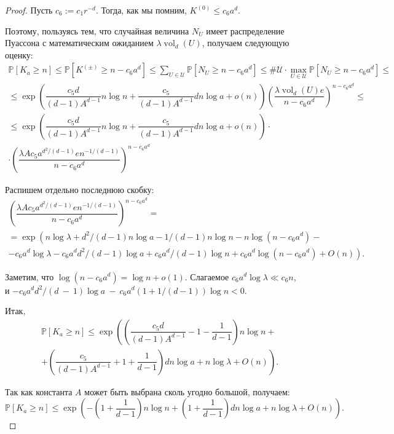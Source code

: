 \documentclass[12pt]{article}
\theoremstyle{plain}
\theoremstyle{definition}
\theoremstyle{remark}
\def\geq{\geqslant}
\def\leq{\leqslant}
\DeclareMathOperator{\vol}{vol}
\newcommand{\PP}{\mathbb{P}}
\begin{document}
\begin{proof}
Пусть $c_6 := c_1r^{-d}$. Тогда, как мы помним, $K^{(0)}\leq c_6a^d.$

Поэтому, пользуясь тем, что случайная величина $N_U$  имеет распределение Пуассона с математическим ожиданием $\lambda\vol_d(U)$, получаем следующую оценку: 
\begin{multline*}
    \PP[K_a\geq n] \leq \PP[K^{(\pm)} \geq n-c_6a^d] \leq \sum_{U\in\mathcal{U}}\PP[N_U \geq n-c_6a^d] \leq
    \#\mathcal{U}\cdot\max_{U\in\mathcal{U}}\PP[N_U\geq n- c_6a^d] \leq \\
    \leq  \exp \left(\dfrac{c_5d}{(d-1)A^{d-1}}n\log n + \dfrac{c_5}{(d-1)A^{d-1}}dn\log a + o(n)\right) \left(\dfrac{\lambda\vol_d(U)e}{n-c_6a^d}\right)^{n-c_6a^d} \leq \\
    \leq 
    \exp \left(\dfrac{c_5d}{(d-1)A^{d-1}}n\log n + \dfrac{c_5}{(d-1)A^{d-1}}dn\log a + o(n)\right)\cdot\\
    \cdot\left(\dfrac{\lambda Ac_5a^{d^2/(d-1)}en^{-1/(d-1)}}{n-c_6a^d}\right)^{n-c_6a^d}
\end{multline*}

Распишем отдельно последнюю скобку:
\begin{multline*}
    \left(\dfrac{\lambda Ac_5a^{d^2/(d-1)}en^{-1/(d-1)}}{n-c_6a^d}\right)^{n-c_6a^d} = \\
    = \exp\left(n\log\lambda + d^2/(d-1)n\log a - 1/(d-1)n\log n - n\log(n-c_6a^d) -\right.\\
    \left.- c_6a^d\log\lambda - c_6a^dd^2/(d-1)\log a + c_6a^d/(d-1)\log n + c_6a^d\log (n-c_6a^d) + O(n)\right).
\end{multline*}

Заметим, что $\log (n - c_6a^d) = \log n + o(1).$ Слагаемое $c_6a^d\log\lambda \ll c_6n$,\\ и $-c_6a^dd^2/(d~-~1)\log a~- ~c_6a^d(1+1/(d-1))\log n < 0$.

Итак,
\begin{multline*}
    \PP[K_a\geq n]\leq
     \exp\left(\left(\dfrac{c_5d}{(d-1)A^{d-1}} - 1 - \dfrac{1}{d-1}\right)n\log n + \right.\\
    +\left.\left(\dfrac{c_5}{(d-1)A^{d-1}} + 1 + \dfrac{1}{d-1}\right)dn\log a + n\log \lambda + O(n) \right).
\end{multline*}{}





Так как константа $A$ может быть выбрана сколь угодно большой, получаем:
\begin{equation*}
    \PP[K_a \geq n] \leq 
     \exp \left(-\left(1+\dfrac{1}{d-1}\right)n\log n + \left(1+\dfrac{1}{d-1}\right)dn\log a + n\log \lambda + O(n) \right).
\end{equation*}{}
\end{proof}{}
\end{document}

